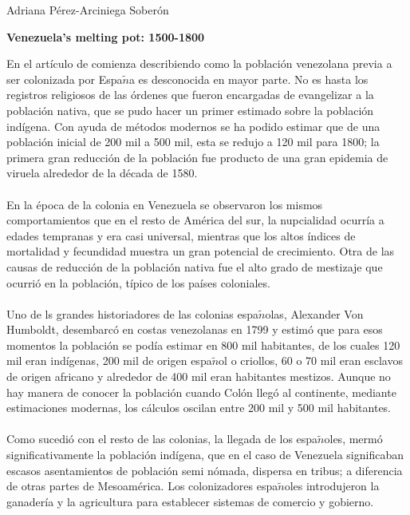 \documentclass[11pt,spanish,letterpaper]{article}
\theoremstyle{plain}
\begin{document}
\begin{flushleft}
Adriana P\'erez-Arciniega Sober\'on
\end{flushleft}
\begin{center}
\textbf{Venezuela’s melting pot: 1500-1800}
\end{center}
En el art\'iculo de \cite{bacci2017venezuela} comienza describiendo como la poblaci\'on venezolana previa a ser colonizada por Espa$\tilde{n}$a es desconocida en mayor parte. No es hasta los registros religiosos de las \'ordenes que fueron encargadas de evangelizar a la poblaci\'on nativa, que se pudo hacer un primer estimado sobre la poblaci\'on ind\'igena. Con ayuda de m\'etodos modernos se ha podido estimar que de una poblaci\'on inicial de 200 mil a 500 mil, esta se redujo a 120 mil para 1800; la primera gran reducci\'on de la poblaci\'on fue producto de una gran epidemia de viruela alrededor de la d\'ecada de 1580.\\
\\
En la \'epoca de la colonia en Venezuela se observaron los mismos comportamientos que en el resto de Am\'erica del sur, la nupcialidad ocurr\'ia a edades tempranas y era casi universal, mientras que los altos \'indices de mortalidad y fecundidad muestra un gran potencial de crecimiento. Otra de las causas de reducci\'on de la poblaci\'on nativa fue el alto grado de mestizaje que ocurri\'o en la poblaci\'on, t\'ipico de los pa\'ises coloniales.\\
\\
Uno de ls grandes historiadores de las colonias espa$\tilde{n}$olas, Alexander Von Humboldt, desembarc\'o en costas venezolanas en 1799 y estim\'o que para esos momentos la poblaci\'on se pod\'ia estimar en 800 mil habitantes, de los cuales 120 mil eran ind\'igenas, 200 mil de origen espa$\tilde{n}$ol o criollos, 60 o 70 mil eran esclavos de origen africano y alrededor de 400 mil eran habitantes mestizos. Aunque no hay manera de conocer la poblaci\'on cuando Col\'on lleg\'o al continente, mediante estimaciones modernas, los c\'alculos oscilan entre 200 mil y 500 mil habitantes.\\
\\
Como sucedi\'o con el resto de las colonias, la llegada de los espa$\tilde{n}$oles, merm\'o significativamente la poblaci\'on ind\'igena, que en el caso de Venezuela significaban escasos asentamientos de poblaci\'on semi n\'omada, dispersa en tribus; a diferencia de otras partes de Mesoam\'erica. Los colonizadores espa$\tilde{n}$oles introdujeron la ganader\'ia y la agricultura para establecer sistemas de comercio y gobierno.\\
\end{document}
